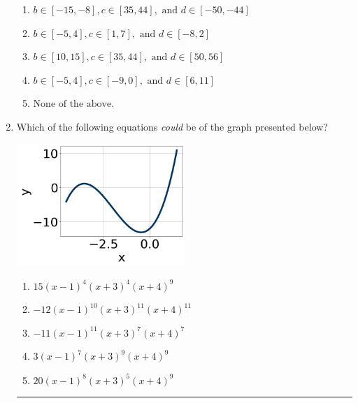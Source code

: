 \documentclass[14pt]{extbook}
\newcommand{\litem}[1]{\item#1\hspace*{-1cm}\rule{\textwidth}{0.4pt}}
\begin{document}
\begin{enumerate}
{\begin{enumerate}[label=\Alph*.]
\item \( b \in [-15, -8], c \in [35, 44], \text{ and } d \in [-50, -44] \)
\item \( b \in [-5, 4], c \in [1, 7], \text{ and } d \in [-8, 2] \)
\item \( b \in [10, 15], c \in [35, 44], \text{ and } d \in [50, 56] \)
\item \( b \in [-5, 4], c \in [-9, 0], \text{ and } d \in [6, 11] \)
\item \( \text{None of the above.} \)

\end{enumerate} }
\litem{
Which of the following equations \textit{could} be of the graph presented below?
\begin{center}
    \includegraphics[width=0.5\textwidth]{../Figures/polyGraphToFunctionCopyB.png}
\end{center}
\begin{enumerate}[label=\Alph*.]
\item \( 15(x - 1)^{4} (x + 3)^{4} (x + 4)^{9} \)
\item \( -12(x - 1)^{10} (x + 3)^{11} (x + 4)^{11} \)
\item \( -11(x - 1)^{11} (x + 3)^{7} (x + 4)^{7} \)
\item \( 3(x - 1)^{7} (x + 3)^{9} (x + 4)^{9} \)
\item \( 20(x - 1)^{8} (x + 3)^{5} (x + 4)^{9} \)


\end{enumerate}}
\end{enumerate}
\end{document}
